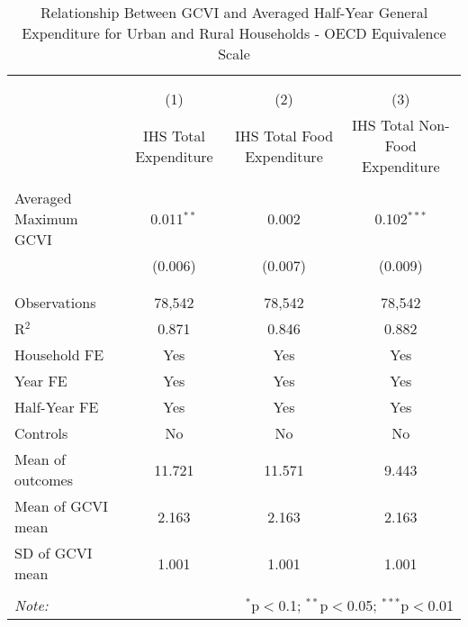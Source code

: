 
\begin{table}[!htbp] \centering 
  \caption{Relationship Between GCVI and Averaged Half-Year General Expenditure for Urban and Rural Households - OECD Equivalence Scale} 
  \label{emop_cons_per_capita_oecd_halfyear_reg.tex} 
\normalsize 
\begin{tabular}{@{\extracolsep{5pt}}lccc} 
\\[-1.8ex]\hline 
\hline \\[-1.8ex] 
\\[-1.8ex] & (1) & (2) & (3)\\ 
 & IHS Total Expenditure & IHS Total Food Expenditure & IHS Total Non-Food Expenditure \\ 
\hline \\[-1.8ex] 
 Averaged Maximum GCVI & 0.011$^{**}$ & 0.002 & 0.102$^{***}$ \\ 
  & (0.006) & (0.007) & (0.009) \\ 
  & & & \\ 
\hline \\[-1.8ex] 
Observations & 78,542 & 78,542 & 78,542 \\ 
R$^{2}$ & 0.871 & 0.846 & 0.882 \\ 
Household FE & Yes & Yes & Yes \\ 
Year FE & Yes & Yes & Yes \\ 
Half-Year FE & Yes & Yes & Yes \\ 
Controls & No & No & No \\ 
Mean of outcomes & 11.721 & 11.571 & 9.443 \\ 
Mean of GCVI mean & 2.163 & 2.163 & 2.163 \\ 
SD of GCVI mean & 1.001 & 1.001 & 1.001 \\ 
\hline \\[-1.8ex] 
\textit{Note:}  & \multicolumn{3}{r}{$^{*}$p$<$0.1; $^{**}$p$<$0.05; $^{***}$p$<$0.01} \\ 
\end{tabular} 
\end{table} 
